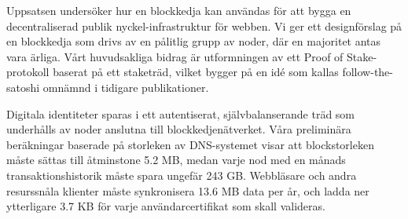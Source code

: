Uppsatsen undersöker hur en blockkedja kan användas för att bygga en decentraliserad publik nyckel-infrastruktur för webben. Vi ger ett designförslag på en blockkedja som drivs av en pålitlig grupp av noder, där en majoritet antas vara ärliga. Vårt huvudsakliga bidrag är utformningen av ett Proof of Stake-protokoll baserat på ett staketräd, vilket bygger på en idé som kallas follow-the-satoshi omnämnd i tidigare publikationer. 

Digitala identiteter sparas i ett autentiserat, självbalanserande träd som underhålls av noder anslutna till blockkedjenätverket. Våra preliminära beräkningar baserade på storleken av DNS-systemet visar att blockstorleken måste sättas till åtminstone 5.2 MB, medan varje nod med en månads transaktionshistorik måste spara ungefär 243 GB. Webbläsare och andra resurssnåla klienter måste synkronisera 13.6 MB data per år, och ladda ner ytterligare 3.7 KB för varje användarcertifikat som skall valideras.
